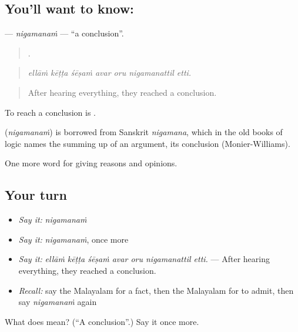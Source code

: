 \subsection*{You'll want to know: }
\textbf{} — \emph{nigamanaṁ} — \textquotedblleft{}a conclusion\textquotedblright{}.

\begin{quote}
      .
\end{quote}

\begin{quote}
\emph{ellāṁ kēṭṭa śēṣaṁ avar oru nigamanattil etti.}
\end{quote}

\begin{quote}
After hearing everything, they reached a conclusion.
\end{quote}

To reach a conclusion is  .

\begin{cousinweb}
\textbf{} (\emph{nigamanaṁ}) is borrowed from Sanskrit \emph{nigamana}, which in the old books of logic names the summing up of an argument, its conclusion (Monier-Williams).
\end{cousinweb}

\begin{grammarlens}[title={What you've built}]
One more word for giving reasons and opinions.
\end{grammarlens}

\subsection*{Your turn}
\begin{itemize}
\raggedright
  \item \emph{Say it:} \emph{nigamanaṁ}
  \item \emph{Say it:} \emph{nigamanaṁ}, once more
  \item \emph{Say it:} \emph{ellāṁ kēṭṭa śēṣaṁ avar oru nigamanattil etti.} — After hearing everything, they reached a conclusion.
  \item \emph{Recall:} say the Malayalam for a fact, then the Malayalam for to admit, then say \emph{nigamanaṁ} again
\end{itemize}

\begin{tcolorbox}[breakable,colback=teal!4,colframe=teal!35!black,title={Before you move on}]
What does  mean? (\textquotedblleft{}A conclusion\textquotedblright{}.) Say it once more.
\end{tcolorbox}
